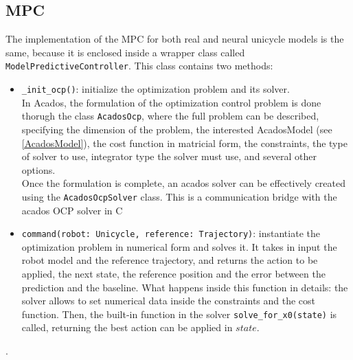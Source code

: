 \subsection{MPC}
The implementation of the MPC for both real and neural unicycle models is the same, because it is
enclosed inside a wrapper class called \texttt{ModelPredictiveController}. This class contains 
two methods:
\begin{itemize}
    \item \texttt{\_init\_ocp()}: initialize the optimization problem and its solver.\\ 
            In Acados, the 
            formulation of the optimization control problem is done thorugh the class \texttt{AcadosOcp},
            where the full problem can be described, specifying the dimension of the problem, the interested
            AcadosModel (see \autoref{AcadosModel}), the cost function in matricial form, the constraints,
            the type of solver to use, integrator type the solver must use, and several other options. \\
            Once the formulation is complete, an acados solver can be effectively created using the 
            \texttt{AcadosOcpSolver} class. This is a communication bridge with the acados OCP solver in C
            
    \item \texttt{command(robot: Unicycle, reference: Trajectory)}: instantiate the optimization problem
            in numerical form and solves it. 
            It takes in input the robot model and the reference trajectory,
            and returns the action to be applied, the next state, the reference position and the error
            between the prediction and the baseline.
            What happens inside this function in details: the solver allows to set numerical data inside 
            the constraints and the cost function. Then, the built-in function in the solver 
            \texttt{solve\_for\_x0(state)} is called, returning the best action can be applied in $state$.
\end{itemize}

.